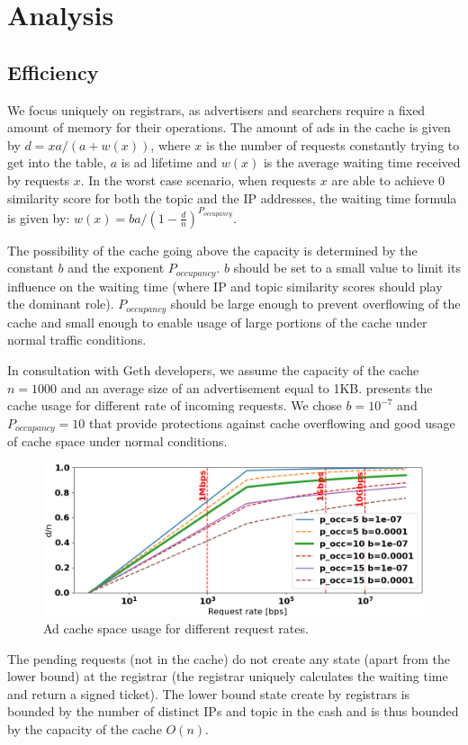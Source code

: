 \section{Analysis}\label{sec:analysis}

\subsection{Efficiency}

We focus uniquely on registrars, as advertisers and searchers require a fixed amount of memory for their operations. The amount of ads in the cache is given by $d = xa/(a + w(x))$, where $x$ is the number of requests constantly trying to get into the table, $a$ is ad lifetime and $w(x)$ is the average waiting time received by requests $x$.
In the worst case scenario, when requests $x$ are able to achieve 0 similarity score for both the topic and the IP addresses, the waiting time formula is given by: $w(x) = ba/(1 - \frac{d}{n})^{P_\textit{occupancy}}$.

The possibility of the cache going above the capacity is determined by the constant $b$ and the exponent $P_\textit{occupancy}$. $b$ should be set to a small value to limit its influence on the waiting time (where IP and topic similarity scores should play the dominant role). $P_\textit{occupancy}$ should be large enough to prevent overflowing of the cache and small enough to enable usage of large portions of the cache under normal traffic conditions. 

In consultation with Geth developers, we assume the capacity of the cache $n = 1000$ and an average size of an advertisement equal to 1KB.  presents the cache usage for different rate of incoming requests. We chose $b=10^{-7}$ and $P_\textit{occupancy}=10$ that provide protections against cache overflowing and good usage of cache space under normal conditions. 

\begin{figure}[t]
    \includegraphics[width=1\linewidth]{img/cache_size_limit}
    \caption{Ad cache space usage for different request rates.
    }
    \label{fig:cache_size_limit}
\end{figure}
The pending requests (\ie not in the cache) do not create any state (apart from the lower bound) at the registrar (\ie the registrar uniquely calculates the waiting time and return a signed ticket). The lower bound state create by registrars is bounded by the number of distinct IPs and topic in the cash and is thus bounded by the capacity of the cache $O(n)$.

